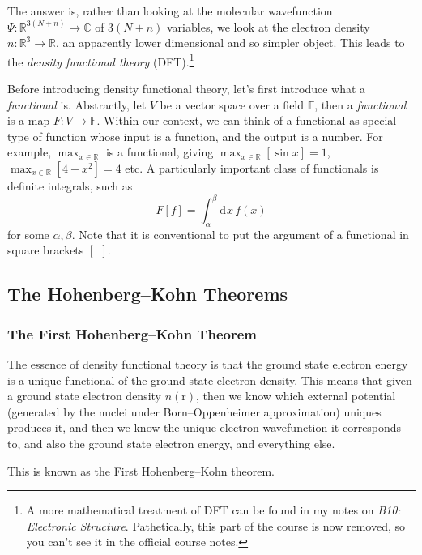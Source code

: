 \documentclass{article}
\theoremstyle{plain}\theoremheaderfont{\normalfont\itshape}\theorembodyfont{\rmfamily}\theoremseparator{.}\newtheorem*{rem}{Remark}\newtheorem*{ex}{Example}\newtheorem*{proof}{Proof}\newtheorem*{altp}{Alternative proof}
\theoremstyle{plain}\theoremheaderfont{\normalfont\bfseries}\theorembodyfont{\rmfamily}\theoremseparator{.}\newtheorem{thm}{Theorem}[section]\newtheorem{lem}[thm]{Lemma}\newtheorem{prop}[thm]{Proposition}\newtheorem*{cor}{Corollary}\newtheorem{defn}[thm]{Definition}\newtheorem{clm}[thm]{Claim}\newtheorem{clminproof}{Claim}\newtheorem{pos}{Postulate}[section]
\theoremstyle{break}\theoremheaderfont{\normalfont\itshape}\theorembodyfont{\rmfamily}\theoremseparator{.\medskip}\newtheorem*{proofskip}{Proof}\newtheorem*{exs}{Examples}\newtheorem*{rems}{Remarks}
\theoremstyle{break}\theoremheaderfont{\normalfont\bfseries}\theorembodyfont{\rmfamily}\theoremseparator{.\medskip}\newtheorem{lemskip}[thm]{Lemma}\newtheorem{defnskip}[thm]{Definition}\newtheorem{propskip}[thm]{Proposition}\newtheorem{thmskip}[thm]{Theorem}
\numberwithin{equation}{section}
\newcommand{\dd}[2][]{\mathrm{d}^{#1} #2\,}
\newcommand{\vb}[1]{\bm{\mathrm{#1}}}
\newcommand{\RR}{\mathbb{R}}
\newcommand{\CC}{\mathbb{C}}
\newcommand{\FF}{\mathbb{F}}
\begin{document}
    The answer is, rather than looking at the molecular wavefunction \(\Psi:\RR^{3(N+n)}\to\CC\) of \(3(N+n)\) variables, we look at the electron density \(n:\RR^3\to\RR\), an apparently lower dimensional and so simpler object. This leads to the \textit{density functional theory} (DFT).\footnote{A more mathematical treatment of DFT can be found in my notes on \textit{B10: Electronic Structure}. Pathetically, this part of the course is now removed, so you can't see it in the official course notes.}

    Before introducing density functional theory, let's first introduce what a \textit{functional} is. Abstractly, let \(V\) be a vector space over a field \(\FF\), then a \textit{functional} is a map \(F:V\to\FF\). Within our context, we can think of a functional as special type of function whose input is a function, and the output is a number. For example, \(\max_{x\in\RR}\) is a functional, giving \(\max_{x\in\RR}[\sin x]=1\), \(\max_{x\in\RR}[4-x^2]=4\) etc. A particularly important class of functionals is definite integrals, such as
    \begin{equation}
        F[f]=\int_{\alpha}^{\beta}\dd{x}f(x)
    \end{equation}
    for some \(\alpha,\beta\). Note that it is conventional to put the argument of a functional in square brackets \([\ \ ]\).

    \subsection{The Hohenberg--Kohn Theorems}
    \subsubsection{The First Hohenberg--Kohn Theorem}
    The essence of density functional theory is that the ground state electron energy is a unique functional of the ground state electron density. This means that given a ground state electron density \(n(\vb{r})\), then we know which external potential (generated by the nuclei under Born--Oppenheimer approximation) uniques produces it, and then we know the unique electron wavefunction it corresponds to, and also the ground state electron energy, and everything else.

    This is known as the First Hohenberg--Kohn theorem.
\end{document}
